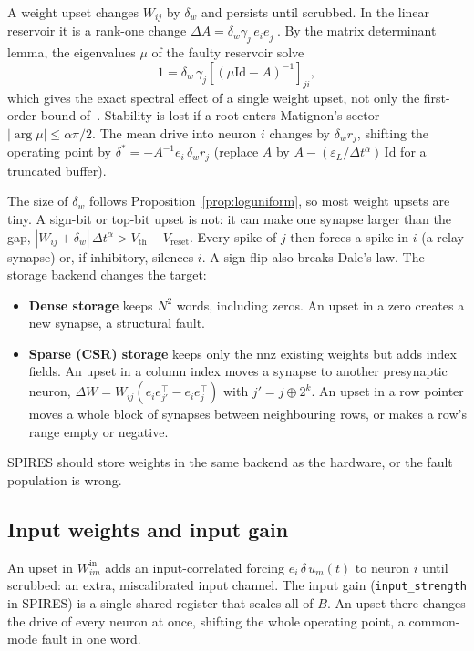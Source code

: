 \documentclass[11pt,a4paper]{article}
\newcommand{\dta}{\Delta t^{\alpha}}
\begin{document}
A weight upset changes $W_{ij}$ by $\delta_w$ and persists until scrubbed. In the linear reservoir it is a rank-one change $\Delta A = \delta_w \gamma_j\, e_i e_j^{\top}$. By the matrix determinant lemma, the eigenvalues $\mu$ of the faulty reservoir solve
\begin{equation}
1 = \delta_w\, \gamma_j \left[ (\mu \mathrm{Id} - A)^{-1} \right]_{ji},
\label{eq:secular}
\end{equation}
which gives the exact spectral effect of a single weight upset, not only the first-order bound of~\cite{dropout2026}. Stability is lost if a root enters Matignon's sector $|\arg\mu| \le \alpha\pi/2$. The mean drive into neuron $i$ changes by $\delta_w r_j$, shifting the operating point by $\delta^{*} = -A^{-1} e_i\, \delta_w r_j$ (replace $A$ by $A - (\varepsilon_L/\dta)\,\mathrm{Id}$ for a truncated buffer).

The size of $\delta_w$ follows Proposition~\ref{prop:loguniform}, so most weight upsets are tiny. A sign-bit or top-bit upset is not: it can make one synapse larger than the gap, $|W_{ij} + \delta_w|\,\dta > V_{\mathrm{th}} - V_{\mathrm{reset}}$. Every spike of $j$ then forces a spike in $i$ (a relay synapse) or, if inhibitory, silences $i$. A sign flip also breaks Dale's law. The storage backend changes the target:
\begin{itemize}
  \item \textbf{Dense storage} keeps $N^2$ words, including zeros. An upset in a zero creates a new synapse, a structural fault.
  \item \textbf{Sparse (CSR) storage} keeps only the $\mathrm{nnz}$ existing weights but adds index fields. An upset in a column index moves a synapse to another presynaptic neuron, $\Delta W = W_{ij}(e_i e_{j'}^{\top} - e_i e_j^{\top})$ with $j' = j \oplus 2^{k}$. An upset in a row pointer moves a whole block of synapses between neighbouring rows, or makes a row's range empty or negative.
\end{itemize}
SPIRES should store weights in the same backend as the hardware, or the fault population is wrong.

\subsection{Input weights and input gain}

An upset in $W^{\mathrm{in}}_{im}$ adds an input-correlated forcing $e_i\,\delta\, u_m(t)$ to neuron $i$ until scrubbed: an extra, miscalibrated input channel. The input gain (\texttt{input\_strength} in SPIRES) is a single shared register that scales all of $B$. An upset there changes the drive of every neuron at once, shifting the whole operating point, a common-mode fault in one word.
\end{document}
